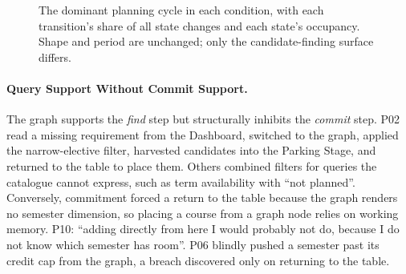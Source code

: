 \documentclass[a4paper,twoside]{article}
\newcommand{\st}[1]{\textsc{#1}}
\begin{document}
\begin{figure}[t]
\centering
{}
\caption{The dominant planning cycle in each condition, with each transition's share of all state changes and each state's occupancy. Shape and period are unchanged; only the candidate-finding surface differs.}
\label{fig:loop}
\end{figure}

\paragraph{Query Support Without Commit Support.}
The graph supports the \emph{find} step but structurally inhibits the \emph{commit} step. P02 read a missing requirement from the Dashboard, switched to the graph, applied the narrow-elective filter, harvested candidates into the Parking Stage, and returned to the table to place them. Others combined filters for queries the catalogue cannot express, such as term availability with ``not planned''. Conversely, commitment forced a return to the table because the graph renders no semester dimension, so placing a course from a graph node relies on working memory. P10: ``adding directly from here I would probably not do, because I do not know which semester has room''. P06 blindly pushed a semester past its credit cap from the graph, a breach discovered only on returning to the table.
\end{document}
